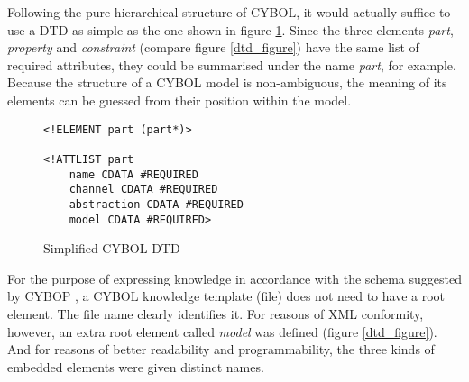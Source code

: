 Following the pure hierarchical structure of CYBOL, it would actually suffice
to use a DTD as simple as the one shown in figure \ref{simpledtd_figure}. Since
the three elements \emph{part}, \emph{property} and \emph{constraint} (compare
figure \ref{dtd_figure}) have the same list of required attributes, they could
be summarised under the name \emph{part}, for example. Because the structure of
a CYBOL model is non-ambiguous, the meaning of its elements can be guessed from
their position within the model.

\begin{figure}[ht]
    \bigskip
    \begin{scriptsize}
        \begin{verbatim}
<!ELEMENT part (part*)>

<!ATTLIST part
    name CDATA #REQUIRED
    channel CDATA #REQUIRED
    abstraction CDATA #REQUIRED
    model CDATA #REQUIRED>
        \end{verbatim}
    \end{scriptsize}
    \caption{Simplified CYBOL DTD}
    \label{simpledtd_figure}
\end{figure}

\clearpage

For the purpose of expressing knowledge in accordance with the schema suggested
by CYBOP \cite{cybop}, a CYBOL knowledge template (file) does not need to have
a root element. The file name clearly identifies it. For reasons of XML
conformity, however, an extra root element called \emph{model} was defined
(figure \ref{dtd_figure}). And for reasons of better readability and
programmability, the three kinds of embedded elements were given distinct names.

